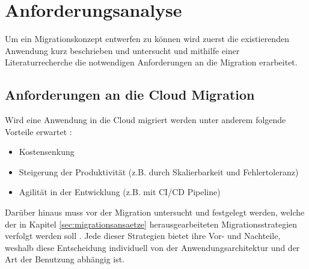 \section{Anforderungsanalyse}
\label{sec:anforderungsanalyse}


Um ein Migrationskonzept entwerfen zu können wird zuerst die existierenden Anwendung kurz beschrieben und untersucht und mithilfe einer Literaturrecherche die notwendigen Anforderungen an die Migration erarbeitet.

\subsection{Anforderungen an die Cloud Migration}
Wird eine Anwendung in die Cloud migriert werden unter anderem folgende Vorteile erwartet \cite[Vgl. auch im Folgenden][03:23-05:36min]{AWS2019}:
\begin{itemize}
\item Kostensenkung
\item Steigerung der Produktivität (z.B. durch Skalierbarkeit und Fehlertoleranz)
\item Agilität in der Entwicklung (z.B. mit CI/CD Pipeline)
\end{itemize}

Darüber hinaus muss vor der Migration untersucht und festgelegt werden, welche der in Kapitel \ref{sec:migrationsansaetze} herausgearbeiteten Migrationsstrategien verfolgt werden soll \cite[Vgl.][10:38-13:23min]{AWS2019}. Jede dieser Strategien bietet ihre Vor- und Nachteile, weshalb diese Entscheidung individuell von der Anwendungsarchitektur und der Art der Benutzung abhängig ist. \pagebreak

